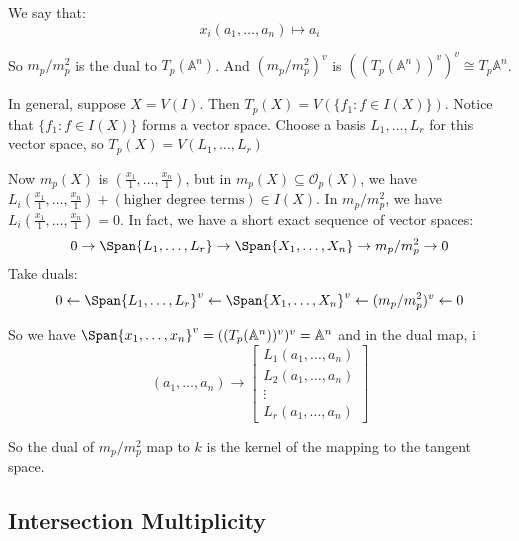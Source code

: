 \documentclass{report}
\begin{document}
We say that:
    \begin{equation*}
        x_{i}(a_{1}, \ldots , a_{n}) \mapsto a_{i}
    \end{equation*}

So $m_{p}/m_{p}^{2}$ is the dual to $T_{p}(\mathbb{A}^{n})$. And $(m_{p}/m_{p}^{2})^{v}$ is $((T_{p}(\mathbb{A}^{n}))^{v})^{v} \cong T_{p}\mathbb{A}^{n}$.

In general, suppose $X = V(I)$. Then $T_{p}(X) = V(\{f_{1}: f \in I(X)\})$. Notice that $\{f_{1} : f \in I(X)\}$ forms a vector space. Choose a basis $L_{1}, \ldots , L_{r}$ for this vector space, so $T_{p}(X) = V(L_{1}, \ldots , L_{r})$

Now $m_{p}(X)$ is $(\frac{x_{1}}{1}, \ldots , \frac{x_{n}}{1})$, but in $m_{p}(X) \subseteq \mathcal{O}_{p}(X)$, we have $L_{i}(\frac{x_{1}}{1}, \ldots , \frac{x_{n}}{1}) + (\text{higher degree terms}) \in I(X)$. In $m_{p}/m_{p}^{2}$, we have $L_{i}(\frac{x_{1}}{1}, \ldots , \frac{x_{n}}{1}) = 0$. In fact, we have a short exact sequence of vector spaces:
    \begin{equation*}
        0 \rightarrow \Span{L_{1}, \ldots , L_{r}} \rightarrow \Span{X_{1}, \ldots , X_{n}} \rightarrow m_{p}/m_{p}^{2} \rightarrow 0
    \end{equation*}
Take duals:
    \begin{equation*}
        0 \leftarrow \Span{L_{1}, \ldots , L_{r}}^{v} \leftarrow \Span{X_{1}, \ldots , X_{n}}^{v} \leftarrow (m_{p}/m_{p}^{2})^{v} \leftarrow 0
    \end{equation*}

So we have $\Span{x_{1}, \ldots , x_{n}}^{v} = ((T_{p}(\mathbb{A}^{n}))^{v})^{v} = \mathbb{A}^{n}$ and in the dual map, i
    \begin{equation*}
        (a_{1}, \ldots , a_{n}) \rightarrow \begin{bmatrix}
            L_{1}(a_{1}, \ldots , a_{n}) \\
            L_{2}(a_{1}, \ldots , a_{n}) \\
            \vdots                       \\
            L_{r}(a_{1}, \ldots , a_{n})   
        \end{bmatrix}
    \end{equation*}

So the dual of $m_{p}/m_{p}^{2}$ map to $k$ is the kernel of the mapping to the tangent space. 

\begin{topic}
    \section{Intersection Multiplicity}
\end{topic}
\end{document}

